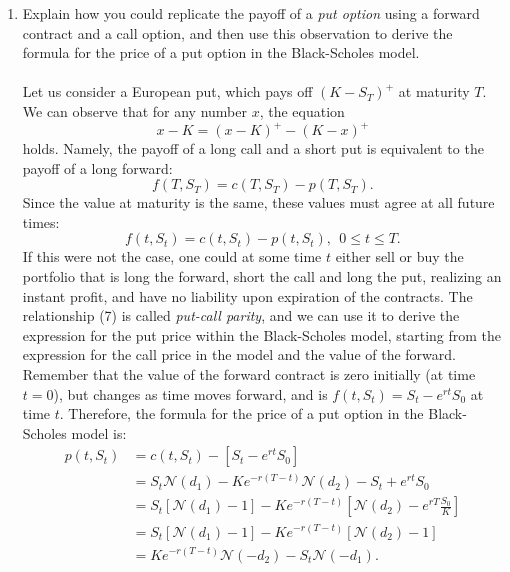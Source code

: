 \documentclass[11pt,a4,table]{article}
\begin{document}
\begin{enumerate}
\begin{enumerate}
        \item Explain how you could replicate the payoff of a \textit{put option} using a forward contract and a call option, and then use this observation to derive the formula for the price of a put option in the Black-Scholes model.\\\\
        Let us consider a European put, which pays off $(K-S_T)^+$ at maturity $T$. We can observe that for any number $x$, the equation
        \begin{equation*}
            x-K = (x-K)^+ - (K-x)^+
        \end{equation*}
        holds. Namely, the payoff of a long call and a short put is equivalent to the payoff of a long forward:
        \begin{equation*}
            f(T,S_T) = c(T,S_T)-p(T,S_T).
        \end{equation*}
        Since the value at maturity is the same, these values must agree at all future times:
        \begin{equation}
            f(t,S_t) = c(t,S_t) -p(t,S_t), ~~ 0\leq t \leq T.
        \end{equation}
        If this were not the case, one could at some time $t$ either sell or buy the portfolio that is long the forward, short the call and long the put, realizing an instant profit, and have no liability upon expiration of the contracts. The relationship (7) is called \textit{put-call parity}, and we can use it to derive the expression for the put price within the Black-Scholes model, starting from the expression for the call price in the model and the value of the forward. Remember that the value of the forward contract is zero initially (at time $t=0$), but changes as time moves forward, and is $f(t,S_t) = S_t - e^{rt}S_0$ at time $t$. Therefore, the formula for the price of a put option in the Black-Scholes model is:
        \begin{align*}
            p(t,S_t) &= c(t,S_t) - [S_t - e^{rt}S_0]\\
            &= S_t\mathcal{N}(d_1) -K e^{-r(T-t)}\mathcal{N}(d_2) - S_t + e^{rt}S_0\\
            &= S_t[\mathcal{N}(d_1)-1]-Ke^{-r(T-t)} \left[\mathcal{N}(d_2) - e^{rT}\frac{S_0}{K}\right]\\
            &= S_t[\mathcal{N}(d_1)-1]-Ke^{-r(T-t)} [\mathcal{N}(d_2) -1]\\
            &= Ke^{-r(T-t)}\mathcal{N}(-d_2) - S_t\mathcal{N}(-d_1).
        \end{align*}
        

\end{enumerate}
\end{enumerate}
\end{document}

